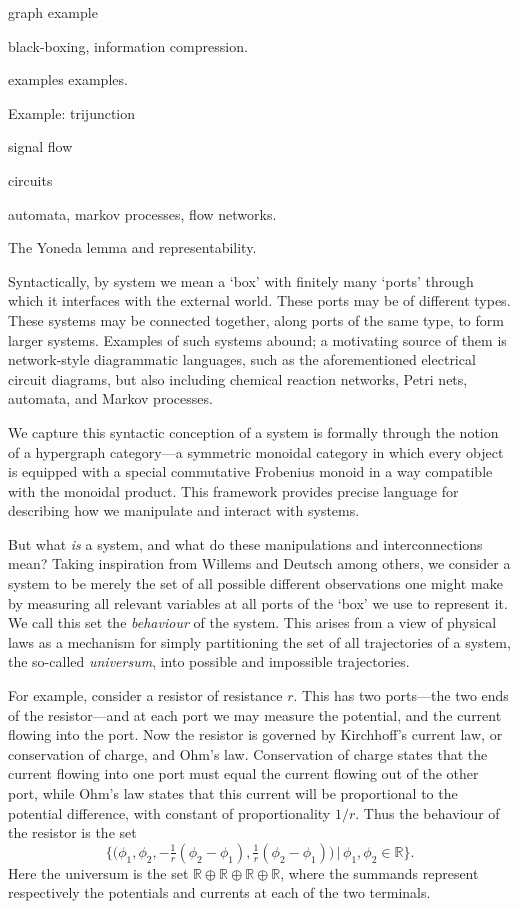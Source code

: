 graph example

black-boxing, information compression.

examples examples.

Example: trijunction

signal flow

circuits

automata, markov processes, flow networks.

The Yoneda lemma and representability.


Syntactically, by system we mean a `box' with finitely many `ports' through which it
interfaces with the external world. These ports may be of different types. These
systems may be connected together, along ports of the same type, to form larger
systems. Examples of such systems abound; a motivating source of them is
network-style diagrammatic languages, such as the aforementioned electrical
circuit diagrams, but also including chemical reaction networks, Petri nets,
automata, and Markov processes.

We capture this syntactic conception of a system is formally through the notion
of a hypergraph category---a symmetric monoidal category in which every object
is equipped with a special commutative Frobenius monoid in a way compatible with
the monoidal product. This framework provides precise language for describing
how we manipulate and interact with systems.


But what \emph{is} a system, and what do these manipulations and
interconnections mean? Taking inspiration from Willems \cite{Wi} and Deutsch
\cite{D} among others, we consider a system to be merely the set of all possible
different observations one might make by measuring all relevant variables at all
ports of the `box' we use to represent it.  We call this set the
\emph{behaviour} of the system. This arises from a view of physical laws as a
mechanism for simply partitioning the set of all trajectories of a system, the
so-called \emph{universum}, into possible and impossible trajectories.

For example, consider a resistor of resistance $r$. This has two ports---the two
ends of the resistor---and at each port we may measure the potential, and the
current flowing into the port. Now the resistor is governed by Kirchhoff's
current law, or conservation of charge, and Ohm's law. Conservation of charge
states that the current flowing into one port must equal the current flowing out
of the other port, while Ohm's law states that this current will be proportional
to the potential difference, with constant of proportionality $1/r$. Thus the
behaviour of the resistor is the set 
\[
  \big\{\big(\phi_1,\phi_2,
    -\tfrac1r(\phi_2-\phi_1),\tfrac1r(\phi_2-\phi_1)\big)\,\big\vert\,
    \phi_1,\phi_2 \in \mathbb{R}\big\}.
\]
Here the universum is the set
$\mathbb{R}\oplus\mathbb{R}\oplus\mathbb{R}\oplus\mathbb{R}$, where the
summands represent respectively the potentials and currents at each of the two
terminals.

